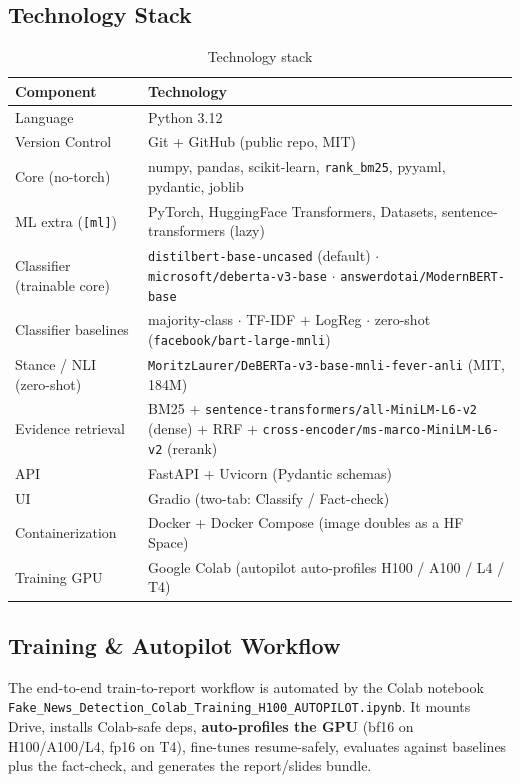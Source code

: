 \documentclass[12pt,a4paper]{article}
\begin{document}
\subsection{Technology Stack}

\begin{table}[H]
\centering
\caption{Technology stack}
\small
\begin{tabularx}{\linewidth}{@{} l L @{}}
\toprule
\textbf{Component} & \textbf{Technology} \\
\midrule
Language & Python 3.12 \\
Version Control & Git + GitHub (public repo, MIT) \\
Core (no-torch) & numpy, pandas, scikit-learn, \texttt{rank\_bm25}, pyyaml, pydantic, joblib \\
ML extra (\texttt{[ml]}) & PyTorch, HuggingFace Transformers, Datasets, sentence-transformers (lazy) \\
Classifier (trainable core) & \texttt{distilbert-base-uncased} (default) $\cdot$ \texttt{microsoft/deberta-v3-base} $\cdot$ \texttt{answerdotai/ModernBERT-base} \\
Classifier baselines & majority-class $\cdot$ TF-IDF + LogReg $\cdot$ zero-shot (\texttt{facebook/bart-large-mnli}) \\
Stance / NLI (zero-shot) & \texttt{MoritzLaurer/DeBERTa-v3-base-mnli-fever-anli} (MIT, 184M) \\
Evidence retrieval & BM25 + \texttt{sentence-transformers/all-MiniLM-L6-v2} (dense) + RRF + \texttt{cross-encoder/ms-marco-MiniLM-L6-v2} (rerank) \\
API & FastAPI + Uvicorn (Pydantic schemas) \\
UI & Gradio (two-tab: Classify / Fact-check) \\
Containerization & Docker + Docker Compose (image doubles as a HF Space) \\
Training GPU & Google Colab (autopilot auto-profiles H100 / A100 / L4 / T4) \\
\bottomrule
\end{tabularx}
\end{table}

\subsection{Training \& Autopilot Workflow}
\label{subsec:workflow}

The end-to-end train-to-report workflow is automated by the Colab notebook \texttt{Fake\_News\_Detection\_Colab\_Training\_H100\_AUTOPILOT.ipynb}. It mounts Drive, installs Colab-safe deps, \textbf{auto-profiles the GPU} (bf16 on H100/A100/L4, fp16 on T4), fine-tunes resume-safely, evaluates against baselines plus the fact-check, and generates the report/slides bundle.
\end{document}
